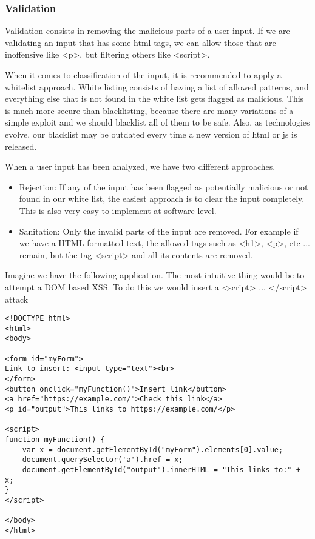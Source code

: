\subsubsection{Validation}
Validation consists in removing the malicious parts of a user input. If we are validating an input that has some html tags, we can allow those that are inoffensive like <p>, but filtering others like <script>.

When it comes to classification of the input, it is recommended to apply a whitelist approach. White listing consists of having a list of allowed patterns, and everything else that is not found in the white list gets flagged as malicious. This is much more secure than blacklisting, because there are many variations of a simple exploit and we should blacklist all of them to be safe. Also, as technologies evolve, our blacklist may be outdated every time a new version of html or js is released. 

When a user input has been analyzed, we have two different approaches.

\begin{itemize}
\item Rejection: If any of the input has been flagged as potentially malicious or not found in our white list, the easiest approach is to clear the input completely. This is also very easy to implement at software level. 

\item Sanitation: Only the invalid parts of the input are removed. For example if we have a HTML formatted text, the allowed tags such as <h1>, <p>, etc ...  remain, but the tag <script> and all its contents are removed.
\end{itemize}

Imagine we have the following application. The most intuitive thing would be to attempt a DOM based XSS. To do this we would insert a <script> ... </script> attack
\begin{lstlisting}[style=JavaScript]
<!DOCTYPE html>
<html>
<body>

<form id="myForm">
Link to insert: <input type="text"><br>
</form> 
<button onclick="myFunction()">Insert link</button>
<a href="https://example.com/">Check this link</a>
<p id="output">This links to https://example.com/</p>

<script>
function myFunction() {
	var x = document.getElementById("myForm").elements[0].value;
	document.querySelector('a').href = x;
	document.getElementById("output").innerHTML = "This links to:" + x;
}
</script>

</body>
</html>

\end{lstlisting}
